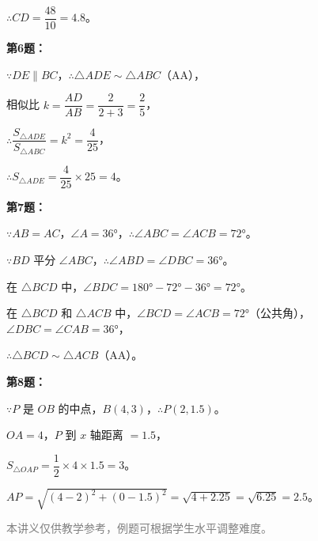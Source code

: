\documentclass[12pt, a4paper]{ctexart}
\begin{document}
\begin{knowledgebox}[参考答案]
$\therefore CD=\dfrac{48}{10}=4.8$。

\medskip
\textbf{第6题：}

$\because DE \parallel BC$，$\therefore \triangle ADE \sim \triangle ABC$（AA），

相似比 $k=\dfrac{AD}{AB}=\dfrac{2}{2+3}=\dfrac{2}{5}$，

$\therefore \dfrac{S_{\triangle ADE}}{S_{\triangle ABC}}=k^2=\dfrac{4}{25}$，

$\therefore S_{\triangle ADE}=\dfrac{4}{25}\times 25=4$。

\medskip
\textbf{第7题：}

$\because AB=AC$，$\angle A=36°$，$\therefore \angle ABC=\angle ACB=72°$。

$\because BD$ 平分 $\angle ABC$，$\therefore \angle ABD=\angle DBC=36°$。

在 $\triangle BCD$ 中，$\angle BDC=180°-72°-36°=72°$。

在 $\triangle BCD$ 和 $\triangle ACB$ 中，$\angle BCD=\angle ACB=72°$（公共角），$\angle DBC=\angle CAB=36°$，

$\therefore \triangle BCD \sim \triangle ACB$（AA）。

\medskip
\textbf{第8题：}

$\because P$ 是 $OB$ 的中点，$B(4,3)$，$\therefore P(2,1.5)$。

$OA=4$，$P$ 到 $x$ 轴距离 $=1.5$，

$S_{\triangle OAP}=\dfrac{1}{2}\times 4\times 1.5=3$。

$AP=\sqrt{(4-2)^2+(0-1.5)^2}=\sqrt{4+2.25}=\sqrt{6.25}=2.5$。

\end{knowledgebox}

\vfill
\begin{center}
\small\textcolor{gray}{本讲义仅供教学参考，例题可根据学生水平调整难度。}
\end{center}
\end{document}
